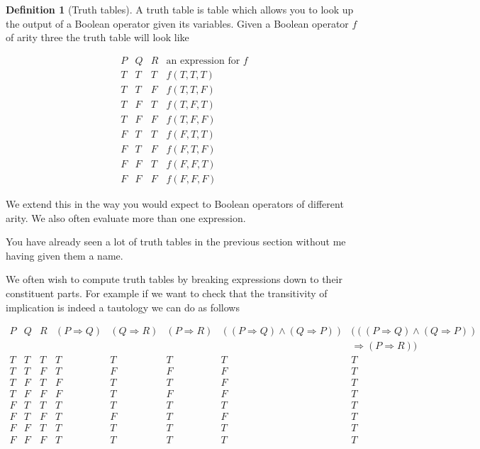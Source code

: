 \documentclass[
]{book}
\theoremstyle{definition}
\newtheorem{definition}{Definition}[chapter]
\theoremstyle{definition}
\theoremstyle{definition}
\theoremstyle{definition}
\theoremstyle{remark}
\begin{document}
\begin{definition}[Truth tables]
A truth table is table which allows you to look up the output of a Boolean operator given its variables. Given a Boolean operator \(f\) of arity three the truth table will look like

\begin{equation}
\begin{array}{ccc|c}
P & Q & R & \mbox{an expression for \(f\)} \\
\hline
T & T & T & f(T,T,T)\\
T & T & F & f(T,T,F)\\
T & F & T & f(T,F,T)\\
T & F & F & f(T,F,F)\\
F & T & T & f(F,T,T)\\
F & T & F & f(F,T,F)\\
F & F & T & f(F,F,T)\\
F & F & F & f(F,F,F)
\end{array}
\end{equation}

We extend this in the way you would expect to Boolean operators of different arity. We also often evaluate more than one expression.

You have already seen a lot of truth tables in the previous section without me having given them a name.
\end{definition}

We often wish to compute truth tables by breaking expressions down to their constituent parts. For example if we want to check that the transitivity of implication is indeed a tautology we can do as follows

\begin{equation}
\begin{array}{ccc|ccccc}
P & Q & R & (P \Rightarrow Q) & (Q \Rightarrow R) & (P \Rightarrow R) & ((P\Rightarrow Q)\wedge (Q\Rightarrow P)) & (((P\Rightarrow Q)\wedge (Q\Rightarrow P))\\
 \, & \, & \, & \, & \, & \, & \, &\Rightarrow (P \Rightarrow R)) \\
\hline
T & T & T & T & T & T & T & T\\
T & T & F & T & F & F & F & T\\
T & F & T & F & T & T & F & T\\
T & F & F & F & T & F & F & T\\
F & T & T & T & T & T & T & T\\
F & T & F & T & F & T & F & T\\
F & F & T & T & T & T & T & T\\
F & F & F & T & T & T & T & T
\end{array}
\end{equation}
\end{document}
